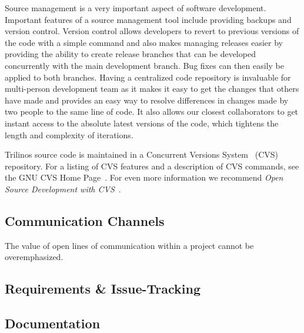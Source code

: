 \documentclass[12pt,relax]{article}
\begin{document}

Source management is a very important aspect of software development. 
Important features of a source management tool include providing backups and
version control.  Version control allows developers to revert to previous
versions of the code with a simple command and also makes managing releases
easier by providing the ability to create release branches that can be
developed concurrently with the main development branch.  Bug fixes can then
easily be applied to both branches.  Having a centralized code repository is
invaluable for multi-person development team as it makes it easy to get the
changes that others have made and provides an easy way to resolve differences
in changes made by two people to the same line of code.  It also allows our
closest collaborators to get instant access to the absolute latest versions
of the code, which tightens the length and complexity of iterations.

Trilinos source code is maintained in a Concurrent Versions System~\cite{CVS}
(CVS) repository.  For a listing of CVS features and a description of 
CVS commands, see the GNU CVS Home Page~\cite{CVS}.  For even more information
we recommend {\it Open Source Development with CVS}~\cite{FogelBarCVS}.

\subsection{Communication Channels}


The value of open lines of communication within a project cannot be 
overemphasized.   

\subsection{Requirements \& Issue-Tracking}


\subsection{Documentation}
\end{document}

